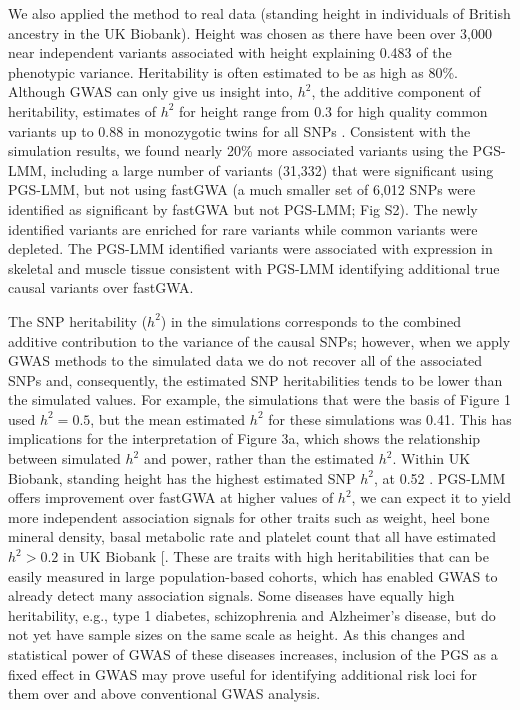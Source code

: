 \documentclass[doublespacing]{bmcart}
\begin{document}
We also applied the method to real data (standing height in individuals of British ancestry in the UK Biobank). Height was chosen as there have been over 3,000 near independent variants associated with height explaining 0.483 of the phenotypic variance. Heritability is often estimated to be as high as 80\%. Although GWAS can only give us insight into, $h^2$, the additive component of heritability, estimates of $h^2$ for height range from 0.3 for high quality common variants up to 0.88 in monozygotic twins for all SNPs \cite{yengo2018meta,hou2019accurate,nolte2017comparison}. Consistent with the simulation results, we found nearly 20\% more associated variants using the PGS-LMM, including a large number of variants (31,332) that were significant using PGS-LMM, but not using fastGWA (a much smaller set of 6,012 SNPs were identified as significant by fastGWA but not PGS-LMM; Fig S2). The newly identified variants are enriched for rare variants while common variants were depleted. The PGS-LMM identified variants were associated with expression in skeletal and muscle tissue consistent with PGS-LMM identifying additional true causal variants over fastGWA.  

The SNP heritability ($h^2$) in the simulations corresponds to the combined additive contribution to the variance of the causal SNPs; however, when we apply GWAS methods to the simulated data we do not recover all of the associated SNPs and, consequently, the estimated SNP heritabilities tends to be lower than the simulated values. For example, the simulations that were the basis of Figure 1 used $h^2 = 0.5$, but the mean estimated $h^2$ for these simulations was 0.41. This has implications for the interpretation of Figure 3a, which shows the relationship between simulated $h^2$ and power, rather than the estimated $h^2$.  Within UK Biobank, standing height has the highest estimated SNP $h^2$, at 0.52 \cite{jiang2019resource}.  PGS-LMM offers improvement over fastGWA at higher values of $h^2$, we can expect it to yield more independent association signals for other traits such as weight, heel bone mineral density, basal metabolic rate and platelet count that all have estimated $h^2 > 0.2$ in UK Biobank [\cite{jiang2019resource,watanabe2019global}. These are traits with high heritabilities that can be easily measured in large population-based cohorts, which has enabled GWAS to already detect many association signals. Some diseases have equally high heritability, e.g., type 1 diabetes, schizophrenia and Alzheimer’s disease, but do not yet have sample sizes on the same scale as height. As this changes and statistical power of GWAS of these diseases increases, inclusion of the PGS as a fixed effect in GWAS may prove useful for identifying additional risk loci for them over and above conventional GWAS analysis. 
\end{document}
